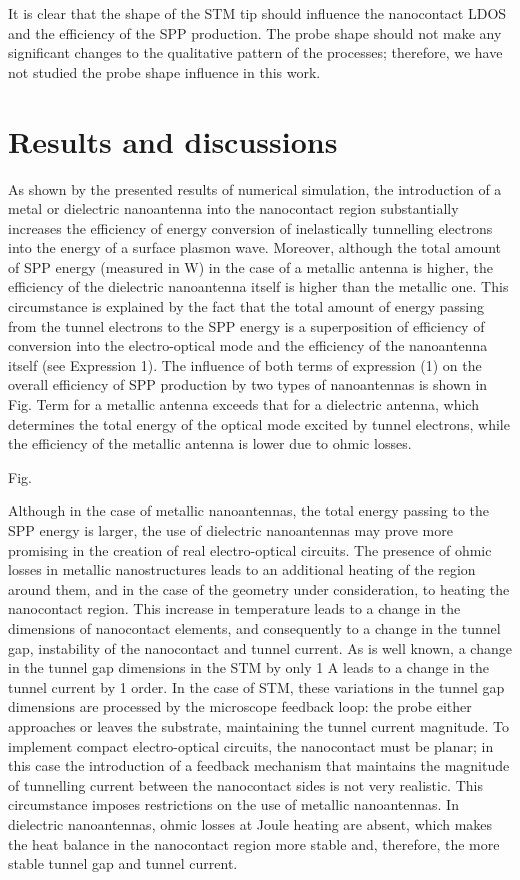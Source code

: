 \documentclass[%
 reprint,
 amsmath,amssymb,
prb,
]{revtex4-1}
\begin{document}
It is clear that the shape of the STM tip should influence the nanocontact LDOS and the efficiency of the SPP production. The probe shape should not make any significant changes to the qualitative pattern of the processes; therefore, we have not studied the probe shape influence in this work.

\section{\label{sec:results}Results and discussions}

	As shown by the presented results of numerical simulation, the introduction of a metal or dielectric nanoantenna into the nanocontact region substantially increases the efficiency of energy conversion of inelastically tunnelling electrons into the energy of a surface plasmon wave. Moreover, although the total amount of SPP energy (measured in W) in the case of a metallic antenna is higher, the efficiency of the dielectric nanoantenna itself is higher than the metallic one. This circumstance is explained by the fact that the total amount of energy passing from the tunnel electrons to the SPP energy is a superposition of efficiency of conversion into the electro-optical mode  and the efficiency of the nanoantenna  itself (see Expression 1). The influence of both terms of expression (1) on the overall efficiency of SPP production by two types of nanoantennas is shown in Fig. Term for a metallic antenna exceeds that for a dielectric antenna, which determines the total energy of the optical mode excited by tunnel electrons, while the efficiency of the metallic antenna is lower due to ohmic losses.

Fig.  

Although in the case of metallic nanoantennas, the total energy passing to the SPP energy is larger, the use of dielectric nanoantennas may prove more promising in the creation of real electro-optical circuits. The presence of ohmic losses in metallic nanostructures leads to an additional heating of the region around them, and in the case of the geometry under consideration, to heating the nanocontact region. This increase in temperature leads to a change in the dimensions of nanocontact elements, and consequently to a change in the tunnel gap, instability of the nanocontact and tunnel current. As is well known, a change in the tunnel gap dimensions in the STM by only 1 A leads to a change in the tunnel current by 1 order. In the case of STM, these variations in the tunnel gap dimensions are processed by the microscope feedback loop: the probe either approaches or leaves the substrate, maintaining the tunnel current magnitude. To implement compact electro-optical circuits, the nanocontact must be planar; in this case the introduction of a feedback mechanism that maintains the magnitude of tunnelling current between the nanocontact sides is not very realistic. This circumstance imposes restrictions on the use of metallic nanoantennas. In dielectric nanoantennas, ohmic losses at Joule heating are absent, which makes the heat balance in the nanocontact region more stable and, therefore, the more stable tunnel gap and tunnel current.
\end{document}
